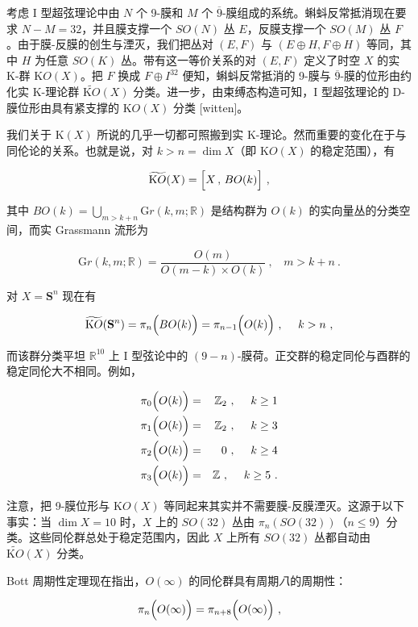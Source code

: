 \documentclass[11pt,a4paper]{ctexart}
\begin{document}
考虑 I 型超弦理论中由 \(N\) 个 9-膜和 \(M\) 个 \(\overline{9}\)-膜组成的系统。蝌蚪反常抵消现在要求 \(N-M=32\)，并且膜支撑一个 \(SO(N)\) 丛 \(E\)，反膜支撑一个 \(SO(M)\) 丛 \(F\)。由于膜-反膜的创生与湮灭，我们把丛对 \((E,F)\) 与 \((E\oplus H,F\oplus H)\) 等同，其中 \(H\) 为任意 \(SO(K)\) 丛。带有这一等价关系的对 \((E,F)\) 定义了时空 \(X\) 的实 K-群 \({\mathrm KO}(X)\)。把 \(F\) 换成 \(F\oplus I^{32}\) 便知，蝌蚪反常抵消的 9-膜与 \(\overline{9}\)-膜的位形由约化实 K-理论群 \(\widetilde{{\mathrm KO}}(X)\) 分类。进一步，由束缚态构造可知，I 型超弦理论的 D-膜位形由具有紧支撑的 \({\mathrm KO}(X)\) 分类 [witten]。

我们关于 \({\mathrm K}(X)\) 所说的几乎一切都可照搬到实 K-理论。然而重要的变化在于与同伦论的关系。也就是说，对 \(k>n=\dim X\)（即 \({\mathrm KO}(X)\) 的稳定范围），有

\[\widetilde{{\mathrm KO}}(X)=\Bigl[X\,,\,BO(k)\Bigr]\ ,\]

其中 \(BO(k)=\bigcup_{m>k+n}{\mathrm Gr}(k,m;{\mathbb{R}})\) 是结构群为 \(O(k)\) 的实向量丛的分类空间，而实 Grassmann 流形为

\[{\mathrm Gr}(k,m;{\mathbb{R}})=\frac{O(m)}{O(m-k)\times O(k)}\ , \ \ \ \ m>k+n\ .\]

对 \(X={\mathbf S}^n\) 现在有

\[\widetilde{{\mathrm KO}}({\mathbf S}^n)=\pi_n\Bigl(BO(k)\Bigr)=\pi_{n-1}\Bigl(O(k)\Bigr)\ ,\
\ \ \  k>n\ ,\]

而该群分类平坦 \({\mathbb{R}}^{10}\) 上 I 型弦论中的 \((9-n)\)-膜荷。正交群的稳定同伦与酉群的稳定同伦大不相同。例如，

\begin{eqnarray}
\pi_0\Bigl(O(k)\Bigr)&=&{\mathbb{Z}}_2\ ,\ \ \ \ k\geq 1\\
\pi_1\Bigl(O(k)\Bigr)&=&{\mathbb{Z}}_2\ ,\ \ \ \ k\geq 3\\
\pi_2\Bigl(O(k)\Bigr)&=&0\ ,\ \ \ \ k\geq 4\\
\pi_3\Bigl(O(k)\Bigr)&=&{\mathbb{Z}}\ , \ \ \ \ k\geq 5\ .
\end{eqnarray}

注意，把 9-膜位形与 \({\mathrm KO}(X)\) 等同起来其实并不需要膜-反膜湮灭。这源于以下事实：当 \(\dim X=10\) 时，\(X\) 上的 \(SO(32)\) 丛由 \(\pi_n(SO(32))\)（\(n\leq 9\)）分类。这些同伦群总处于稳定范围内，因此 \(X\) 上所有 \(SO(32)\) 丛都自动由 \(\widetilde{{\mathrm KO}}(X)\) 分类。

Bott 周期性定理现在指出，\(O(\infty)\) 的同伦群具有周期\emph{八}的周期性：

\[\pi_n\Bigl(O(\infty)\Bigr)=\pi_{n+8}\Bigl(O(\infty)\Bigr)\ ,\]
\end{document}
